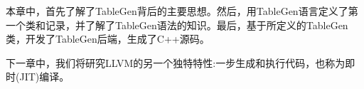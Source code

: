 
本章中，首先了解了TableGen背后的主要思想。然后，用TableGen语言定义了第一个类和记录，并了解了TableGen语法的知识。最后，基于所定义的TableGen类，开发了TableGen后端，生成了C++源码。

下一章中，我们将研究LLVM的另一个独特特性:一步生成和执行代码，也称为即时(JIT)编译。

